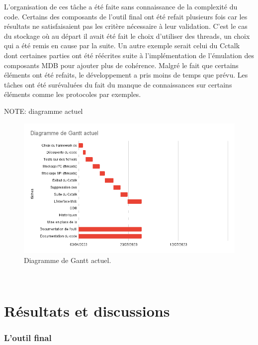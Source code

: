 \documentclass[a4paper]{article}
\begin{document}
L'organisation de ces tâche a été faite sans connaissance de la complexité du
code. Certains des composants de l'outil final ont été refait plusieurs fois car
les résultats ne satisfaisaient pas les critère nécessaire à leur validation.
C'est le cas du stockage où au départ il avait été fait le choix d'utiliser des
threads, un choix qui a été remis en cause par la suite. Un autre exemple serait
celui du Cctalk dont certaines parties ont été réécrites suite à
l'implémentation de l'émulation des composants MDB pour ajouter plus de
cohérence. Malgré le fait que certains éléments ont été refaits, le
développement a pris moins de temps que prévu. Les tâches ont été surévaluées du
fait du manque de connaissances sur certains éléments comme les protocoles par
exemples.

NOTE: diagramme actuel

\begin{figure}[h!]
  \begin{center}
  \includegraphics[scale=0.6]{./img/current-gantt.png}
  \caption{Diagramme de Gantt actuel.}
  \end{center}
\end{figure}~\\
\clearpage
\part{Résultats et discussions}

\section{L'outil final}
\end{document}
